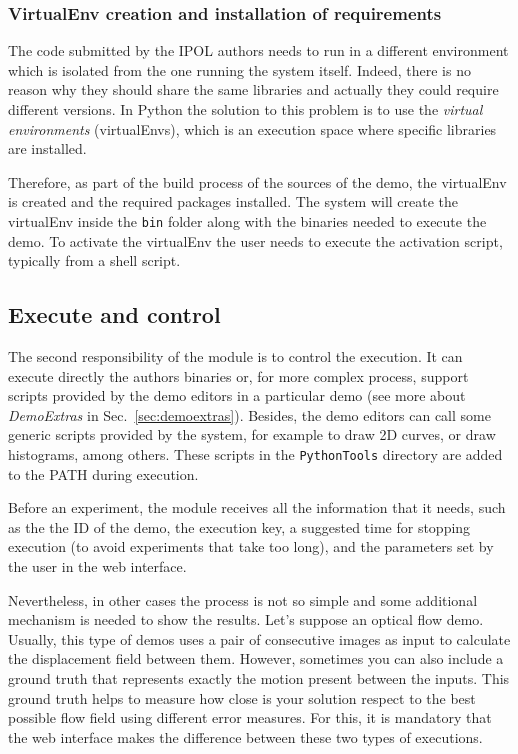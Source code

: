 \subsubsection{VirtualEnv creation and installation of requirements}
\noindent

The code submitted by the IPOL authors needs to run in a different environment which is isolated from the one running the system itself. Indeed, there is no reason why they should share the same libraries and actually they could require different versions. In Python the solution to this problem is to use the \emph{virtual environments} (virtualEnvs), which is an execution space where specific libraries are installed.

Therefore, as part of the build process of the sources of the demo, the virtualEnv is created and the required packages installed.
%
The system will create the virtualEnv inside the {\tt bin} folder along with the binaries needed to execute the demo. To activate the virtualEnv the user needs to execute the activation script, typically from a shell script.


\subsection{Execute and control}
\noindent

The second responsibility of the module is to control the execution.  It can execute directly the authors binaries or, for more complex process, support scripts provided by the demo editors in a particular demo (see more about \textit{DemoExtras} in Sec.~\ref{sec:demoextras}). Besides, the demo editors can call some generic scripts provided by the system, for example to draw 2D curves, or draw histograms, among others. These scripts in the {\tt PythonTools} directory are added to the PATH during execution.

Before an experiment, the module receives all the information that it needs, such as the the ID of the demo, the execution key, a suggested time for stopping execution (to avoid experiments that take too long), and the parameters set by the user in the web interface.

Nevertheless, in other cases the process is not so simple and some additional mechanism is needed to show the results.  Let's suppose an optical flow demo. Usually, this type of demos uses a pair of consecutive images as input to calculate the displacement field between them. However, sometimes you can also include a ground truth that represents exactly the motion present between the inputs. This ground truth helps to measure how close is your solution respect to the best possible flow field using different error measures. For this, it is mandatory that the web interface makes the difference between these two types of executions. 


